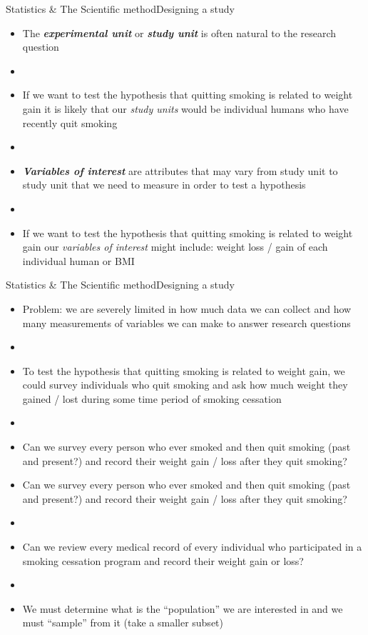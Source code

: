 \documentclass[xcolor=dvipsnames]{beamer}
\begin{document}
\begin{frame}{Statistics \& The Scientific method}{Designing a study}
	\vspace{-12pt}
	\begin{itemize}
		\item The \textbf{\emph{experimental unit}} or \textbf{\emph{study unit}} is often natural to the research question 
		\item[]
		\item If we want to test the hypothesis that quitting smoking is related to weight gain it is likely that our \emph{study units} would be individual humans who have recently quit smoking
		\item[]
		\item \textbf{\emph{Variables of interest}} are attributes that may vary from study unit to study unit that we need to measure in order to test a hypothesis
		\item[]
		\item If we want to test the hypothesis that quitting smoking is related to weight gain our \emph{variables of interest} might include: weight loss / gain of each individual human or BMI
	\end{itemize}
\end{frame}

\begin{frame}{Statistics \& The Scientific method}{Designing a study}
	\vspace{-12pt}
	\begin{itemize}
		\item Problem: we are severely limited in how much data we can collect and how many measurements of variables we can make to answer research questions
		\item[]
		\item To test the hypothesis that quitting smoking is related to weight gain, we could survey individuals who quit smoking and ask how much weight they gained / lost during some time period of smoking cessation
		\item[]
		\item Can we survey every person who ever smoked and then quit smoking (past and present?) and record their weight gain / loss after they quit smoking?
	\end{itemize}
\end{frame}

\begin{frame}
	\begin{itemize}
		\item Can we survey every person who ever smoked and then quit smoking (past and present?) and record their weight gain / loss after they quit smoking?
		\item[]
		\item Can we review every medical record of every individual who participated in a smoking cessation program and record their weight gain or loss?
		\item[]
		\item We must determine what is the ``population'' we are interested in and we must “sample” from it (take a smaller subset)
	\end{itemize}
\end{frame}
\end{document}

